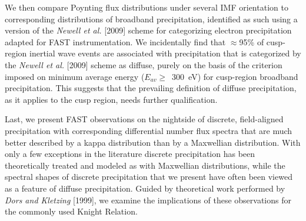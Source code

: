 We then compare \Alfic Poynting flux distributions under several IMF orientation
to corresponding distributions of broadband precipitation, identified as such
using a version of the \textsl{Newell et al.}  [2009] scheme for categorizing
electron precipitation adapted for FAST instrumentation. We incidentally find
that $\approx$95\% of cusp-region inertial \Alf wave events are associated with
precipitation that is categorized by the \textsl{Newell et al.} [2009] scheme as
diffuse, purely on the basis of the criterion imposed on minimum average energy
($E_{av} \geq$~300~eV) for cusp-region broadband precipitation. This suggests
that the prevailing definition of diffuse precipitation, as it applies to the
cusp region, needs further qualification.

Last, we present FAST observations on the nightside of discrete, field-aligned
precipitation with corresponding differential number flux spectra that are much
better described by a kappa distribution than by a Maxwellian distribution. With
only a few exceptions in the literature discrete precipitation has been
theoretically treated and modeled as with Maxwellian distributions, while the
spectral shapes of discrete precipitation that we present have often been viewed
as a feature of diffuse precipitation. Guided by theoretical work performed by
\textsl{Dors and Kletzing} [1999], we examine the implications of these
observations for the commonly used Knight Relation.





